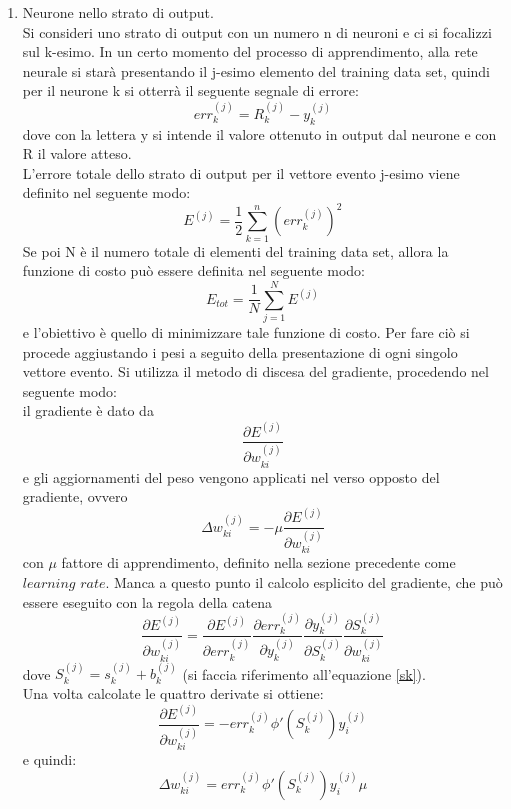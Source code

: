 \begin{enumerate}
	\item Neurone nello strato di output.\\
	Si consideri uno strato di output con un numero n di neuroni e ci si focalizzi sul k-esimo. In un certo momento del processo di apprendimento, alla rete neurale si starà presentando il j-esimo elemento del training data set, quindi per il neurone k si otterrà il seguente segnale di errore:
	\begin{equation}
	err_k^{(j)} = R_k^{(j)} - y_k^{(j)}
	\end{equation}
	dove con la lettera y si intende il valore ottenuto in output dal neurone e con R il valore atteso. \\
	L'errore totale dello strato di output per il vettore evento j-esimo viene definito nel seguente modo:
	\begin{equation}
	E^{(j)} = \frac{1}{2} \sum_{k=1}^{n} (err_k^{(j)})^2
	\end{equation}
	Se poi N è il numero totale di elementi del training data set, allora la funzione di costo può essere definita nel seguente modo:
	\begin{equation}
	E_{tot} = \frac{1}{N}\sum_{j=1}^{N} E^{(j)}
	\end{equation}
	e l'obiettivo è quello di minimizzare tale funzione di costo. Per fare ciò si procede aggiustando i pesi a seguito della presentazione di ogni singolo vettore evento.
	Si utilizza il metodo di discesa del gradiente, procedendo nel seguente modo: \\
	il gradiente è dato da
	\begin{equation}
	\frac{\partial E^{(j)} }{\partial w_{ki}^{(j)}}
	\end{equation}
	e gli aggiornamenti del peso vengono applicati nel verso opposto del gradiente, ovvero
	\begin{equation}
	\Delta w_{ki}^{(j)} = -\mu \frac{\partial E^{(j)} }{\partial w_{ki}^{(j)}}
	\end{equation}
	con $\mu$ fattore di apprendimento, definito nella sezione precedente come $\textit{learning rate}$.
	Manca a questo punto il calcolo esplicito del gradiente, che può essere eseguito con la regola della catena 
	\begin{equation}
	\frac{\partial E^{(j)} }{\partial w_{ki}^{(j)}} = \frac{\partial E^{(j)}}{\partial err_k^{(j)}}
	\frac{\partial err_k^{(j)}}{\partial y_k^{(j)}}
	\frac{\partial y_k^{(j)}}{\partial S_k^{(j)}}
	\frac{\partial S_k^{(j)}}{\partial w_{ki}^{(j)}}
	\end{equation}
	dove $S_k^{(j)} = s_k^{(j)} + b_k^{(j)} $ (si faccia riferimento all'equazione \eqref{sk}). \\
	Una volta calcolate le quattro derivate si ottiene:
	\begin{equation}
	\frac{\partial E^{(j)} }{\partial w_{ki}^{(j)}} =
	-err_k^{(j)}\phi'(S_k^{(j)})y_i^{(j)}
	\end{equation}
	e quindi:
	\begin{equation}
	\Delta w_{ki}^{(j)} = err_k^{(j)}\phi'(S_k^{(j)})y_i^{(j)} \mu
	\end{equation}
	

\end{enumerate}
